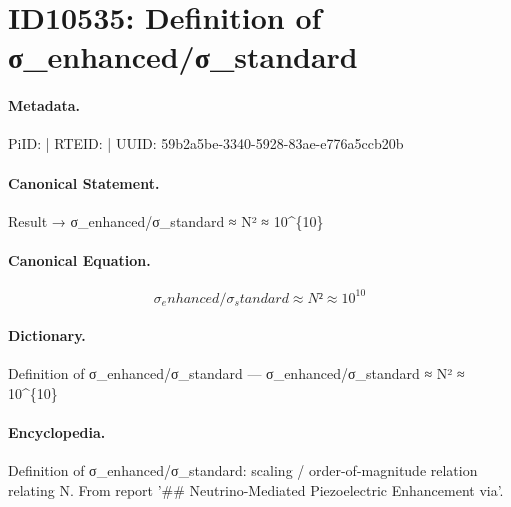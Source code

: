 \section*{ID10535: Definition of σ\_enhanced/σ\_standard}
\paragraph{Metadata.}
PiID:  | RTEID:  | UUID: 59b2a5be-3340-5928-83ae-e776a5ccb20b

\paragraph{Canonical Statement.}
Result → σ\_enhanced/σ\_standard ≈ N² ≈ 10\textasciicircum{}\{10\}

\paragraph{Canonical Equation.}
\[
σ_enhanced/σ_standard ≈ N² ≈ 10^{10}
\]

\paragraph{Dictionary.}
Definition of σ\_enhanced/σ\_standard — σ\_enhanced/σ\_standard ≈ N² ≈ 10\textasciicircum{}\{10\}

\paragraph{Encyclopedia.}
Definition of σ\_enhanced/σ\_standard: scaling / order-of-magnitude relation relating N. From report '\#\# Neutrino-Mediated Piezoelectric Enhancement via'.
